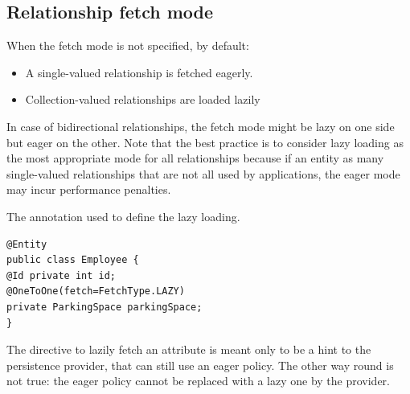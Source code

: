 \subsection*{Relationship fetch mode}
When the fetch mode is not specified, by default:
\begin{itemize}
    \item A single-valued relationship is fetched eagerly. 
    \item Collection-valued relationships are loaded lazily
\end{itemize}
In case of bidirectional relationships, the fetch mode might be lazy on one side but eager on the other. Note that the best practice is to consider lazy loading 
as the most appropriate mode for all relationships because if an entity as many single-valued relationships that are not all used by applications, the eager mode may 
incur performance penalties. 
\begin{example}
    The annotation used to define the lazy loading.
    \begin{lstlisting}[style=Java]
@Entity
public class Employee {
@Id private int id;
@OneToOne(fetch=FetchType.LAZY)
private ParkingSpace parkingSpace;
}
    \end{lstlisting}
\end{example}
The directive to lazily fetch an attribute is meant only to be a hint to the persistence provider, that can still use an eager policy. The other way round is not true: 
the eager policy cannot be replaced with a lazy one by the provider. 

